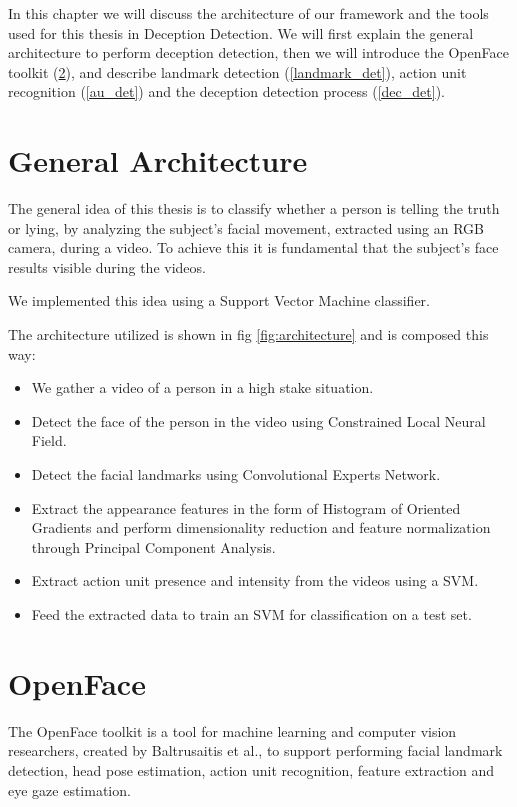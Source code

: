 In this chapter we will discuss the architecture of our framework and the tools used for this thesis in Deception Detection. We will first explain the general architecture to perform deception detection, then we will introduce the OpenFace toolkit (\ref{OpenFace}), and describe landmark detection (\ref{landmark_det}), action unit recognition (\ref{au_det}) and the deception detection process (\ref{dec_det}).

\section{General Architecture}
The general idea of this thesis is to classify whether a person is telling the truth or lying, by analyzing the subject's facial movement, extracted using an RGB camera, during a video. To achieve this it is fundamental that the subject's face results visible during the videos.

We implemented this idea using a Support Vector Machine classifier. 

The architecture utilized is shown in fig \ref{fig:architecture} and is composed this way:

\begin{itemize}
	\item We gather a video of a person in a high stake situation.
	\item Detect the face of the person in the video using Constrained Local Neural Field.
	\item Detect the facial landmarks using Convolutional Experts Network.
	\item Extract the appearance features in the form of Histogram of Oriented Gradients and perform dimensionality reduction and feature normalization through Principal Component Analysis.
	\item Extract action unit presence and intensity from the videos using a SVM.
	\item Feed the extracted data to train an SVM for classification on a test set.
\end{itemize}

\clearpage

\section{OpenFace} \label{OpenFace}
The OpenFace \cite{Baltru2018} toolkit is a tool for machine learning and computer vision researchers, created by Baltrusaitis et al., to support performing facial landmark detection, head pose estimation, action unit recognition, feature extraction and eye gaze estimation. 

